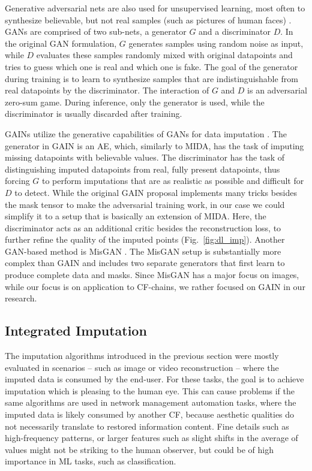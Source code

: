 				Generative adversarial nets are also used for unsupervised learning, most often to synthesize believable, but not real samples (such as pictures of human faces) \cite{gan}.
				\acp{GAN} are comprised of two sub-nets, a generator $G$ and a discriminator $D$.
				In the original \ac{GAN} formulation, $G$ generates samples using random noise as input, while $D$ evaluates these samples randomly mixed with original datapoints and tries to guess which one is real and which one is fake.
				The goal of the generator during training is to learn to synthesize samples that are indistinguishable from real datapoints by the discriminator.
				The interaction of $G$ and $D$ is an adversarial zero-sum game.
				During inference, only the generator is used, while the discriminator is usually discarded after training.
				
				\acp{GAIN} utilize the generative capabilities of \acp{GAN} for data imputation \cite{gain}.
				The generator in \ac{GAIN} is an \ac{AE}, which, similarly to \ac{MIDA}, has the task of imputing missing datapoints with believable values.
				The discriminator has the task of distinguishing imputed datapoints from real, fully present datapoints, thus forcing $G$ to perform imputations that are as realistic as possible and difficult for $D$ to detect.
				While the original \ac{GAIN} proposal implements many tricks besides the mask tensor to make the adversarial training work, in our case we could simplify it to a setup that is basically an extension of \ac{MIDA}.
				Here, the discriminator acts as an additional critic besides the reconstruction loss, to further refine the quality of the imputed points (Fig.~\ref{fig:dl_imp}).
				Another \ac{GAN}-based method is \ac{MisGAN} \cite{misgan}.
				The \ac{MisGAN} setup is substantially more complex than \ac{GAIN} and includes two separate generators that first learn to produce complete data and masks.
				Since \ac{MisGAN} has a major focus on images, while our focus is on application to \ac{CF}-chains, we rather focused on \ac{GAIN} in our research.
			
			\subsection{Integrated Imputation}
				
				The imputation algorithms introduced in the previous section were mostly evaluated in scenarios -- such as image or video reconstruction -- where the imputed data is consumed by the end-user.
				For these tasks, the goal is to achieve imputation which is pleasing to the human eye.
				This can cause problems if the same algorithms are used in network management automation tasks, where the imputed data is likely consumed by another \ac{CF}, because aesthetic qualities do not necessarily translate to restored information content.
				Fine details such as high-frequency patterns, or larger features such as slight shifts in the average of values might not be striking to the human observer, but could be of high importance in \ac{ML} tasks, such as classification.
				
